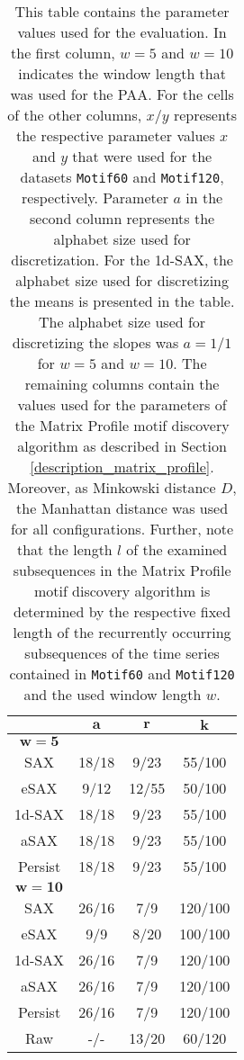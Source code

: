 \begin{table}[H]
\centering
\begin{tabular}{cccc} 
\toprule
 & $\mathbf{a}$ & $\mathbf{r}$ & $\mathbf{k}$ \\
\midrule
$\mathbf{w = 5}$ &  &  & \\
\ac{SAX} & 18/18 & 9/23 & 55/100 \\
\ac{eSAX} & 9/12 & 12/55 & 50/100 \\
\ac{1d-SAX} & 18/18 & 9/23 & 55/100 \\
\ac{aSAX} & 18/18 & 9/23 & 55/100 \\
Persist & 18/18 & 9/23 & 55/100 \\
\midrule
$\mathbf{w = 10}$ &  &  & \\
\ac{SAX} & 26/16 & 7/9 & 120/100 \\
\ac{eSAX} & 9/9 & 8/20 & 100/100 \\
\ac{1d-SAX} & 26/16 & 7/9 & 120/100 \\
\ac{aSAX} & 26/16 & 7/9 & 120/100 \\
Persist & 26/16 & 7/9 & 120/100 \\
\midrule
Raw & -/- & 13/20 & 60/120 \\
\bottomrule
\end{tabular}
\vspace*{0.5cm}
\caption[Evaluation - Parameters for the Matrix Profile]{This table contains the parameter values used for the evaluation. In the first column, $w = 5$ and $w = 10$ indicates the window length that was used for the \ac{PAA}. For the cells of the other columns, $x/y$ represents the respective parameter values $x$ and $y$ that were used for the datasets \texttt{Motif60} and \texttt{Motif120}, respectively. Parameter $a$ in the second column represents the alphabet size used for discretization. For the \ac{1d-SAX}, the alphabet size used for discretizing the means is presented in the table. The alphabet size used for discretizing the slopes was $a = 1/1$ for $w = 5$ and $w = 10$. The remaining columns contain the values used for the parameters of the Matrix Profile motif discovery algorithm as described in Section \ref{description_matrix_profile}. Moreover, as Minkowski distance $D$, the Manhattan distance was used for all configurations. Further, note that the length $l$ of the examined subsequences in the Matrix Profile motif discovery algorithm is determined by the respective fixed length of the recurrently occurring subsequences of the time series contained in \texttt{Motif60} and \texttt{Motif120} and the used window length $w$.}
\label{tab:params_matrix_profile}
\end{table}
